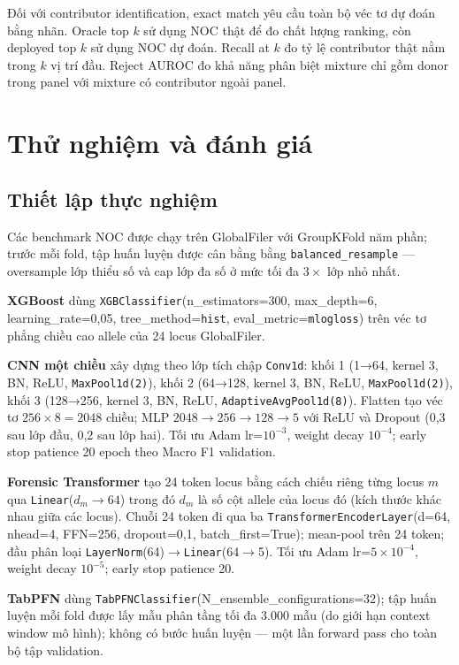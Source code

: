 \documentclass[12pt,a4paper]{article}
\begin{document}
Đối với contributor identification, exact match yêu cầu toàn bộ véc tơ dự đoán bằng nhãn. Oracle top \(k\) sử dụng NOC thật để đo chất lượng ranking, còn deployed top \(k\) sử dụng NOC dự đoán. Recall at \(k\) đo tỷ lệ contributor thật nằm trong \(k\) vị trí đầu. Reject AUROC đo khả năng phân biệt mixture chỉ gồm donor trong panel với mixture có contributor ngoài panel.

\section{Thử nghiệm và đánh giá}

\subsection{Thiết lập thực nghiệm}

Các benchmark NOC được chạy trên GlobalFiler với GroupKFold năm phần; trước mỗi fold, tập huấn luyện được cân bằng bằng \texttt{balanced\_resample} — oversample lớp thiểu số và cap lớp đa số ở mức tối đa $3\times$ lớp nhỏ nhất.

\textbf{XGBoost} dùng \texttt{XGBClassifier}(n\_estimators=300, max\_depth=6, learning\_rate=0{,}05, tree\_method=\texttt{hist}, eval\_metric=\texttt{mlogloss}) trên véc tơ phẳng chiều cao allele của 24 locus GlobalFiler.

\textbf{CNN một chiều} xây dựng theo lớp tích chập \texttt{Conv1d}: khối 1 (1→64, kernel 3, BN, ReLU, \texttt{MaxPool1d(2)}), khối 2 (64→128, kernel 3, BN, ReLU, \texttt{MaxPool1d(2)}), khối 3 (128→256, kernel 3, BN, ReLU, \texttt{AdaptiveAvgPool1d(8)}). Flatten tạo véc tơ $256\times8=2048$ chiều; MLP $2048\to256\to128\to5$ với ReLU và Dropout (0{,}3 sau lớp đầu, 0{,}2 sau lớp hai). Tối ưu Adam lr=$10^{-3}$, weight decay $10^{-4}$; early stop patience 20 epoch theo Macro F1 validation.

\textbf{Forensic Transformer} tạo 24 token locus bằng cách chiếu riêng từng locus $m$ qua \texttt{Linear}($d_m\to64$) trong đó $d_m$ là số cột allele của locus đó (kích thước khác nhau giữa các locus). Chuỗi 24 token đi qua ba \texttt{TransformerEncoderLayer}(d=64, nhead=4, FFN=256, dropout=0{,}1, batch\_first=True); mean-pool trên 24 token; đầu phân loại \texttt{LayerNorm}(64)$\to$\texttt{Linear}(64$\to$5). Tối ưu Adam lr=$5\times10^{-4}$, weight decay $10^{-5}$; early stop patience 20.

\textbf{TabPFN} dùng \texttt{TabPFNClassifier}(N\_ensemble\_configurations=32); tập huấn luyện mỗi fold được lấy mẫu phân tầng tối đa 3.000 mẫu (do giới hạn context window mô hình); không có bước huấn luyện — một lần forward pass cho toàn bộ tập validation.
\end{document}
